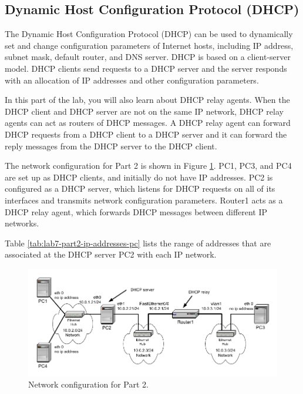 \newpage
\subsection{Dynamic Host Configuration Protocol (DHCP)}

The Dynamic Host Configuration Protocol (DHCP) can be used to dynamically set and change configuration parameters of Internet hosts, including IP address, subnet mask, default router, and DNS server. DHCP is based on a client-server model. DHCP clients send requests to a DHCP server and the server responds with an allocation of IP addresses and other configuration parameters.

In this part of the lab, you will also learn about DHCP relay agents. When the DHCP client and DHCP server are not on the same IP network, DHCP relay agents can act as routers of DHCP messages. A DHCP relay agent can forward DHCP requests from a DHCP client to a DHCP server and it can forward the reply messages from the DHCP server to the DHCP client.

The network configuration for Part 2 is shown in Figure \ref{fig:lab7-part2}. PC1, PC3, and PC4 are set up as DHCP clients, and initially do not have IP addresses. PC2 is configured as a DHCP server, which listens for DHCP requests on all of its interfaces and transmits network configuration parameters. Router1 acts as a DHCP relay agent, which forwards DHCP messages between different IP networks.

Table \ref{tab:lab7-part2-ip-addresses-pc} lists the range of addresses that are associated at the DHCP server PC2 with each IP network.

\begin{figure}[h!t]
	\centering
	\includegraphics{graphics/lab7-part2-updated.pdf}	
	\caption{Network configuration for Part 2.}
	\label{fig:lab7-part2}
\end{figure}

